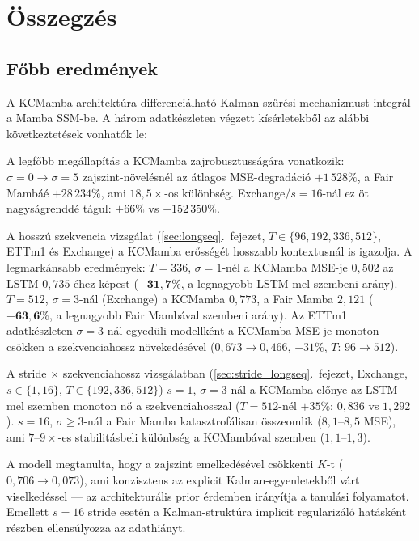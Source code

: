 \chapter{Összegzés}
\label{ch:osszegzes}

\section{Főbb eredmények}

A KCMamba architektúra differenciálható Kalman-szűrési mechanizmust
integrál a Mamba SSM-be. A három adatkészleten végzett kísérletekből
az alábbi következtetések vonhatók le:

A legfőbb megállapítás a KCMamba zajrobusztusságára vonatkozik:
$\sigma=0 \to \sigma=5$ zajszint-növelésnél az átlagos MSE-degradáció
$+1\,528\%$, a Fair Mambáé $+28\,234\%$, ami $18{,}5\times$-os különbség.
Exchange/$s=16$-nál ez öt nagyságrenddé tágul: $+66\%$ vs $+152\,350\%$.

A hosszú szekvencia vizsgálat (\ref{sec:longseq}.~fejezet,
$T \in \{96,192,336,512\}$, ETTm1 és Exchange) a KCMamba erősségét
hosszabb kontextusnál is igazolja. A legmarkánsabb eredmények:
$T{=}336$, $\sigma{=}1$-nél a KCMamba MSE-je $0{,}502$ az LSTM
$0{,}735$-éhez képest ($\mathbf{-31{,}7\%}$, a legnagyobb LSTM-mel szembeni
arány). $T{=}512$, $\sigma{=}3$-nál (Exchange) a KCMamba $0{,}773$,
a Fair Mamba $2{,}121$ ($\mathbf{-63{,}6\%}$, a legnagyobb Fair Mambával
szembeni arány). Az ETTm1 adatkészleten $\sigma{=}3$-nál egyedüli
modellként a KCMamba MSE-je monoton csökken a szekvenciahossz
növekedésével ($0{,}673 \to 0{,}466$, $-31\%$, $T{:}\,96 \to 512$).

A stride $\times$ szekvenciahossz vizsgálatban (\ref{sec:stride_longseq}.~fejezet,
Exchange, $s \in \{1,16\}$, $T \in \{192,336,512\}$) $s{=}1$,
$\sigma{=}3$-nál a KCMamba előnye az LSTM-mel szemben monoton nő
a szekvenciahosszal ($T{=}512$-nél $+35\%$: $0{,}836$ vs $1{,}292$).
$s{=}16$, $\sigma{\geq}3$-nál a Fair Mamba katasztrofálisan összeomlik
($8{,}1$--$8{,}5$ MSE), ami $7$--$9\times$-es stabilitásbeli különbség
a KCMambával szemben ($1{,}1$--$1{,}3$).

A modell megtanulta, hogy a zajszint emelkedésével csökkenti $K$-t
($0{,}706 \to 0{,}073$), ami konzisztens az explicit Kalman-egyenletekből
várt viselkedéssel --- az architekturális prior érdemben irányítja a
tanulási folyamatot. Emellett $s=16$ stride esetén a Kalman-struktúra
implicit regularizáló hatásként részben ellensúlyozza az adathiányt.

